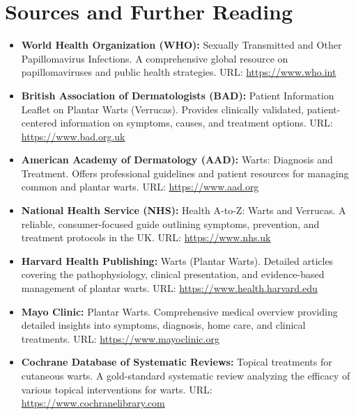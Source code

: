\section*{Sources and Further Reading}
\begin{itemize}
    \item \textbf{World Health Organization (WHO):} Sexually Transmitted and Other Papillomavirus Infections. A comprehensive global resource on papillomaviruses and public health strategies. URL: \url{https://www.who.int}
    \item \textbf{British Association of Dermatologists (BAD):} Patient Information Leaflet on Plantar Warts (Verrucas). Provides clinically validated, patient-centered information on symptoms, causes, and treatment options. URL: \url{https://www.bad.org.uk}
    \item \textbf{American Academy of Dermatology (AAD):} Warts: Diagnosis and Treatment. Offers professional guidelines and patient resources for managing common and plantar warts. URL: \url{https://www.aad.org}
    \item \textbf{National Health Service (NHS):} Health A-to-Z: Warts and Verrucas. A reliable, consumer-focused guide outlining symptoms, prevention, and treatment protocols in the UK. URL: \url{https://www.nhs.uk}
    \item \textbf{Harvard Health Publishing:} Warts (Plantar Warts). Detailed articles covering the pathophysiology, clinical presentation, and evidence-based management of plantar warts. URL: \url{https://www.health.harvard.edu}
    \item \textbf{Mayo Clinic:} Plantar Warts. Comprehensive medical overview providing detailed insights into symptoms, diagnosis, home care, and clinical treatments. URL: \url{https://www.mayoclinic.org}
    \item \textbf{Cochrane Database of Systematic Reviews:} Topical treatments for cutaneous warts. A gold-standard systematic review analyzing the efficacy of various topical interventions for warts. URL: \url{https://www.cochranelibrary.com}
\end{itemize}